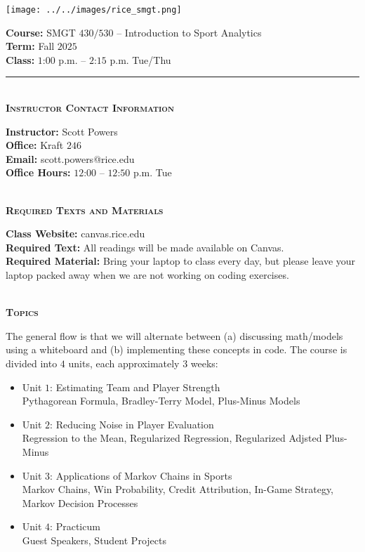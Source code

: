\documentclass[11pt]{article}
\begin{document}
\begin{minipage}[c]{0.4\linewidth}
  \texttt{[image: ../../images/rice\_smgt.png]}
\end{minipage}
\begin{minipage}[c]{0.6\linewidth}
  \raggedleft
  {\bf Course:} SMGT $430/530$ -- Introduction to Sport Analytics\\
  {\bf Term:} Fall $2025$\\
  {\bf Class:} $1$:$00$ p.m. -- $2$:$15$ p.m. Tue/Thu
\end{minipage}

\hrule

~\\
\textbf{\textsc{Instructor Contact Information}}
\begin{adjustwidth}{1cm}{0cm}
	{\bf Instructor:} Scott Powers\\
  {\bf Office:} Kraft $246$\\
  {\bf Email:} scott.powers@rice.edu\\
  {\bf Office Hours:} $12$:$00$ -- $12$:$50$ p.m. Tue
\end{adjustwidth}

~\\
\textbf{\textsc{Required Texts and Materials}}
\begin{adjustwidth}{1cm}{0cm}
	{\bf Class Website:} canvas.rice.edu\\
	{\bf Required Text:} All readings will be made available on Canvas.\\
	{\bf Required Material:} Bring your laptop to class every day, but please leave your laptop packed away when we are not working on coding exercises.
\end{adjustwidth}

~\\
\textbf{\textsc{Topics}}
\begin{adjustwidth}{1cm}{0cm}
  The general flow is that we will alternate between (a) discussing math/models using a whiteboard and (b) implementing these concepts in code. The course is divided into $4$ units, each approximately $3$ weeks:
  \begin{itemize}
    \item Unit $1$: Estimating Team and Player Strength\\
    Pythagorean Formula, Bradley-Terry Model, Plus-Minus Models
    \item Unit $2$: Reducing Noise in Player Evaluation\\
    Regression to the Mean, Regularized Regression, Regularized Adjsted Plus-Minus
    \item Unit $3$: Applications of Markov Chains in Sports\\
    Markov Chains, Win Probability, Credit Attribution, In-Game Strategy, Markov Decision Processes
    \item Unit $4$: Practicum\\
    Guest Speakers, Student Projects
  \end{itemize}
\end{adjustwidth}
\end{document}
